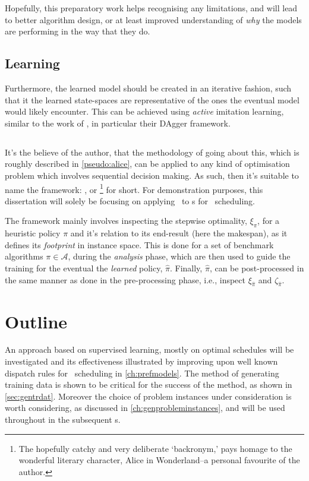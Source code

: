 Hopefully, this preparatory work helps recognising any limitations, and will 
lead to better algorithm design, or at least improved understanding of 
\emph{why} the models are performing in the way that they do.

\subsection*{Learning}
Furthermore, the learned model should be created in an iterative fashion, such 
that it the learned state-spaces are representative of the ones the eventual 
model would likely encounter. This can be achieved using \emph{active} 
imitation learning, similar to the work of \cite{RossB10,RossGB11}, in 
particular their DAgger framework. 

\subsection*{\Alice}
It's the believe of the author, that the methodology of going about this, which 
is roughly described in \cref{pseudo:alice}, can be applied to any kind of 
optimisation problem which involves sequential decision making. 
As such, then it's suitable to name the framework:
\emph{\fullnameAlice}, or \Alice\footnote{
    The hopefully catchy and very deliberate `backronym,' pays homage to 
    the wonderful literary character, Alice in Wonderland--a personal 
    favourite of the author.} 
for short. 
For demonstration purposes, this dissertation will solely be 
focusing on applying \Alice\ to \dr s for \jsp\ scheduling.



The framework mainly involves inspecting the stepwise optimality, $\xi_\pi$, 
for a heuristic policy $\pi$ and it's relation to its end-result (here the 
makespan), as it defines its \emph{footprint} in instance space.
This is done for a set of benchmark algorithms $\pi\in\mathcal{A}$, during the 
\emph{analysis} phase, which are then used to guide the training 
for the eventual the \emph{learned} policy, $\hat{\pi}$. 
Finally, $\hat{\pi}$, can be post-processed in the same manner as done in the 
pre-processing phase, i.e., inspect $\xi_{\hat{\pi}}$ and $\zeta_{\hat{\pi}}$.

\section{Outline}
An approach based on supervised learning, mostly on optimal schedules will be 
investigated and its effectiveness illustrated by improving upon well known 
dispatch rules for \jsp\ scheduling in \cref{ch:prefmodels}. The method of 
generating training data is shown to be critical for the success of the method, 
as shown in \cref{sec:gentrdat}. Moreover the choice of problem 
instances under consideration is worth considering, as discussed in 
\cref{ch:genprobleminstances}, and will be used throughout in the subsequent 
s. 

